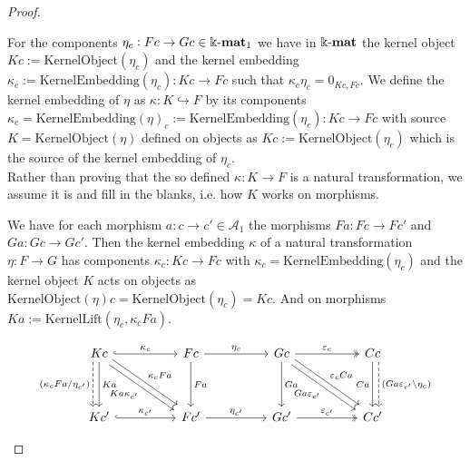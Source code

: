 \begin{proof}
\begin{enumerate}
\begin{subproof}
For the components $\eta_{c} : Fc \rightarrow Gc \in \Bbbk\textnormal{-}\mathbf{mat}_{1}$ we have in $\Bbbk\textnormal{-}\mathbf{mat}$ the kernel object $Kc := \mathrm{KernelObject}(\eta_{c})$
and the kernel embedding
$\kappa_{c} := \mathrm{KernelEmbedding}(\eta_{c}) : Kc \rightarrow Fc$ such that
$\kappa_{c} \eta_{c} = 0_{Kc,Fc}$.
We define the kernel embedding of $\eta$ as $\kappa : K \hookrightarrow F$ by its components
$\kappa_{c} = \mathrm{KernelEmbedding}(\eta)_{c} := \mathrm{KernelEmbedding}(\eta_{c}) : Kc \rightarrow Fc$ with source
$K = \mathrm{KernelObject}(\eta)$ defined on objects as $Kc := \mathrm{KernelObject}(\eta_{c})$ which is the source of the
kernel embedding of $\eta_{c}$.\\
Rather than proving that the so defined $\kappa : K \rightarrow F$ is a natural transformation, we assume it is and fill in the blanks, i.e. 
how $K$ works on morphisms.

We have for each morphism $a : c \rightarrow c' \in \mathcal{A}_{1}$ the morphisms $Fa : Fc \rightarrow Fc'$ and
$Ga : Gc \rightarrow Gc'$. Then the kernel embedding $\kappa$ of a natural transformation $\eta : F \rightarrow G$ has components
$\kappa_{c} : Kc \rightarrow Fc$ with $\kappa_{c} = \mathrm{KernelEmbedding}(\eta_{c})$ and the kernel object $K$ acts on objects
as $\mathrm{KernelObject}(\eta)c = \mathrm{KernelObject}(\eta_{c}) = Kc$.
And on morphisms $Ka := \mathrm{KernelLift}(\eta_{c},\kappa_{c}Fa)$.

\[
\begin{tikzcd}
Kc \arrow[dd, "Ka"] \arrow[rr, "\kappa_{c}", hook] \arrow[rrdd, "\kappa_{c}Fa", shift left] \arrow[rrdd, "Ka\kappa_{c'}"', shift right] \arrow[dd, "(\kappa_{c}Fa/\eta_{c'})"', dashed, shift right=2] &  & Fc \arrow[rr, "\eta_{c}"] \arrow[dd, "Fa"] &  & Gc \arrow[dd, "Ga"] \arrow[rr, "\varepsilon_{c}", two heads] \arrow[rrdd, "Ga\varepsilon_{c'}"', shift right] \arrow[rrdd, "\varepsilon_{c}Ca", shift left] &  & Cc \arrow[dd, "Ca"'] \arrow[dd, "(Ga\varepsilon_{c'}\backslash \eta_{c})", dashed, shift left=2] \\
                                                                                                                                                                                                       &  &                                            &  &                                                                                                                                                             &  &                                                                                                  \\
Kc' \arrow[rr, "\kappa_{c'}", hook]                                                                                                                                                                    &  & Fc' \arrow[rr, "\eta_{c'}"]                &  & Gc' \arrow[rr, "\varepsilon_{c'}", two heads]                                                                                                               &  & Cc'                                                                                             
\end{tikzcd}
\]


\end{subproof}
\end{enumerate}
\end{proof}
